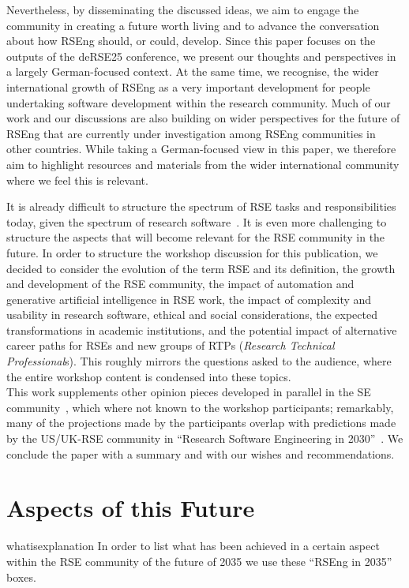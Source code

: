 \documentclass{eceasst}
\begin{document}
Nevertheless, by disseminating the discussed ideas,
we aim to engage the community in creating a future worth living
and to advance the conversation about how RSEng should, or could, develop.
Since this paper focuses on the outputs of the deRSE25 conference, we present our thoughts and perspectives in a largely German-focused context.
At the same time, we recognise, the wider international growth of RSEng as a very important development
for people undertaking software development within the research community.
Much of our work and our discussions are also building on wider perspectives for the future of RSEng that are currently under
investigation among RSEng communities in other countries.
While taking a German-focused view in this paper, we therefore aim to highlight resources and materials from
the wider international community where we feel this is relevant.

It is already difficult to structure the spectrum of RSE tasks and responsibilities
today, given the spectrum of research software~\cite{Hasselbring2024}.
It is even more challenging to structure the aspects that will become relevant for the RSE community in the future.
In order to structure the workshop discussion for this publication, we decided to consider
the evolution of the term RSE and its definition,
the growth and development of the RSE community,
the impact of automation and generative artificial intelligence in RSE work,
the impact of complexity and usability in research software,
ethical and social considerations,
the expected transformations in academic institutions,
and the potential impact of alternative career paths for RSEs
and new groups of RTPs (\emph{Research Technical Professional}s).
This roughly mirrors the questions asked to the audience, where the entire workshop content is condensed into these topics.\\
This work supplements other opinion pieces developed in parallel
in the SE community~\cite{ChueHong2025,Sochat2024Infra,Bencomo2024AEBoK,OliveiraJr2024,Druskat2025,Carleton2022},
which where not known to the workshop participants; remarkably,
many of the projections made by the participants overlap with predictions made
by the US/UK-RSE community in ``Research Software Engineering in 2030''~\cite{Katz2023}.
We conclude the paper with a summary and with our wishes and recommendations.

\section{Aspects of this Future}
\begin{whatis}{}{whatisexplanation}
In order to list what has been achieved in a certain aspect within the RSE community of the future of 2035 we use these ``RSEng in 2035'' boxes.
\end{whatis}
\end{document}
